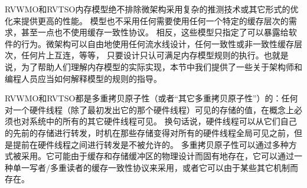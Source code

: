 RVWMO和RVTSO内存模型绝不排除微架构采用复杂的推测技术或其它形式的优化来提供更高的性能。
模型也不采用任何需要使用任何一个特定的缓存层次的需求，甚至一点也不使用缓存一致性协议。
相反，这些模型只指定了可以暴露给软件的行为。微架构可以自由地使用任何流水线设计，任何一致性或非一致性缓存层次，任何片上互连，等等，
只要设计只认可满足内存模型规则的执行。也就是说，为了帮助人们理解内存模型的实际实现，本节中我们提供了一些关于架构师和编程人员应当如何解释模型的规则的指导。

RVWMO和RVTSO都是多重拷贝原子性（或者“其它多重拷贝原子性”）的：任何对一个硬件线程（除了最初发出它的那个硬件线程）可见的存储的值，在概念上必须也对系统中的所有的其它硬件线程可见。
换句话说，硬件线程可以从它们自己的先前的存储进行转发，时机在那些存储变得对所有的硬件线程全局可见之前，但是提前在硬件线程之间进行转发是不被允许的。
多重拷贝原子性可以通过多种方式被采用。它可能由于缓存和存储缓冲区的物理设计而固有地存在，它可以通过一种单一写者/多重读者的缓存一致性协议来采用，或者它可以由于某些其它机制而存在。

